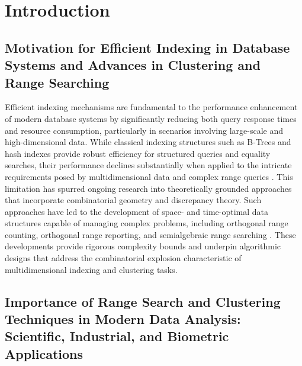 \documentclass[sigconf]{acmart}
\begin{document}
\maketitle

\section{Introduction}

\subsection{Motivation for Efficient Indexing in Database Systems and Advances in Clustering and Range Searching}

Efficient indexing mechanisms are fundamental to the performance enhancement of modern database systems by significantly reducing both query response times and resource consumption, particularly in scenarios involving large-scale and high-dimensional data. While classical indexing structures such as B-Trees and hash indexes provide robust efficiency for structured queries and equality searches, their performance declines substantially when applied to the intricate requirements posed by multidimensional data and complex range queries \cite{ref31}. This limitation has spurred ongoing research into theoretically grounded approaches that incorporate combinatorial geometry and discrepancy theory. Such approaches have led to the development of space- and time-optimal data structures capable of managing complex problems, including orthogonal range counting, orthogonal range reporting, and semialgebraic range searching \cite{ref1}. These developments provide rigorous complexity bounds and underpin algorithmic designs that address the combinatorial explosion characteristic of multidimensional indexing and clustering tasks.

\subsection{Importance of Range Search and Clustering Techniques in Modern Data Analysis: Scientific, Industrial, and Biometric Applications}
\end{document}
